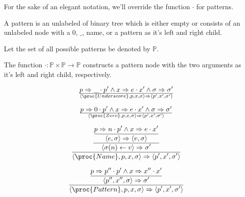 For the sake of an elegant notation, we'll override the function $\cdot$ for
patterns.

\begin{definition}

A pattern is an unlabeled of binary tree which is either empty or consists of
an unlabeled node with a $0$, $\_$, name, or a pattern as it's left and right
child. 

\end{definition}

\begin{definition}

Let the set of all possible patterns be denoted by $\mathbb{P}$.

\end{definition}

\begin{definition}

The function $\cdot
:\mathbb{P}\times\mathbb{P}\rightarrow\mathbb{P}$ constructs a pattern node with the
two arguments as it's left and right child, respectively. 

\end{definition}

\begin{equation}
{
    p\Rightarrow \_\cdot p'
  \wedge
    x\Rightarrow e\cdot x'
  \wedge
    \sigma\Rightarrow\sigma'
}\over{
  \left\langle\proc{Underscore}, p,x,\sigma\right\rangle
  \Rightarrow
  \left\langle p',x',\sigma'\right\rangle
}
\end{equation}

\begin{equation}
{
    p\Rightarrow 0\cdot p'
  \wedge
    x\Rightarrow e\cdot x'
  \wedge
    \sigma\Rightarrow\sigma'
}\over{
  \left\langle\proc{Zero}, p,x,\sigma\right\rangle
  \Rightarrow
  \left\langle p',x',\sigma'\right\rangle
}
\end{equation}


\begin{equation}
{\displaystyle
{\displaystyle
{\displaystyle
    p\Rightarrow n\cdot p'
  \wedge
    x\Rightarrow e\cdot x'
\over\displaystyle
    \left\langle e,\sigma\right\rangle
    \Rightarrow
    \left\langle v,\sigma\right\rangle
}\over\displaystyle
    \left\langle\sigma(n)\leftarrow v\right\rangle
    \Rightarrow
    \sigma'
}\over\displaystyle
  \left\langle\proc{Name}, p,x,\sigma\right\rangle
  \Rightarrow
  \left\langle p',x',\sigma'\right\rangle
}
\end{equation}

\begin{equation}
{\displaystyle
{\displaystyle
    p\Rightarrow p''\cdot p'  
  \wedge
    x\Rightarrow x''\cdot x'
\over\displaystyle
  \left\langle p'', x'', \sigma\right\rangle
  \Rightarrow
  \sigma'
}
\over\displaystyle
  \left\langle\proc{Pattern}, p,x,\sigma\right\rangle
  \Rightarrow
  \left\langle p',x',\sigma'\right\rangle
}
\end{equation}


